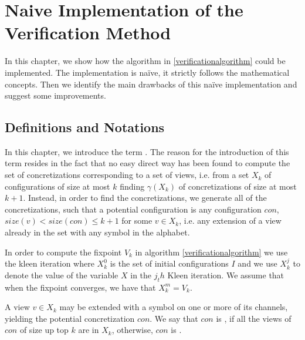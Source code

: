 \section{Naive Implementation of the Verification Method}
\label{naive}
In this chapter, we show how the algorithm in \ref{verificationalgorithm} could be implemented. The implementation is naïve, it strictly follows the mathematical concepts. Then we identify the main drawbacks of this naïve implementation and suggest some improvements.

\subsection{Definitions and Notations}
In this chapter, we introduce the term . The reason for the introduction of this term resides in the fact that no easy direct way has been found to compute the set of concretizations corresponding to a set of views, i.e. from a set $X_k$ of configurations of size at most $k$ finding $\gamma(X_k)$ of concretizations of size at most $k+1$. Instead, in order to find the concretizations, we generate all of the  concretizations, such that a potential configuration is any configuration $con$, $size(v) < size(con) \leq k+1$ for some $v \in X_k$, i.e. any extension of a view already in the set with any symbol in the alphabet.

In order to compute the fixpoint $V_k$ in algorithm \ref{verificationalgorithm} we use the kleen iteration where $X_k^0$ is the set of initial configurations $I$ and we use $X_k^j$ to denote the value of the variable $X$ in the $j_th$ Kleen iteration. We assume that when the fixpoint converges, we have that $X_k^m=V_k$.

 
A view $v\in X_k$ may be extended with a symbol on one or more of its channels, yielding the potential concretization $con$. We say that $con$ is , if all the views of $con$ of size up top $k$ are in $X_k$, otherwise, $con$ is . 

